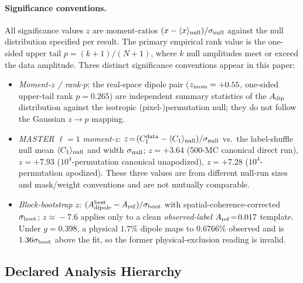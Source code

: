 \documentclass[aps,prd,twocolumn,superscriptaddress,preprintnumbers,nofootinbib,longbibliography,floatfix]{revtex4-2}
\begin{document}
\paragraph{Significance conventions.}
All significance values $z$ are moment-ratios $(x - \langle x\rangle_{\rm null})/\sigma_{\rm null}$ against the null distribution specified per result. The primary empirical rank value is the one-sided upper tail $p=(k+1)/(N+1)$, where $k$ null amplitudes meet or exceed the data amplitude. Three distinct significance conventions appear in this paper:
\begin{itemize}\setlength{\itemsep}{0pt}
\item \emph{Moment-$z$ / rank-$p$}: the real-space dipole pair ($z_{\rm mom}=+0.55$, one-sided upper-tail rank $p=0.265$) are independent summary statistics of the $A_{\rm dip}$ distribution against the isotropic (pixel-)permutation null; they do not follow the Gaussian $z\!\to\!p$ mapping.
\item \emph{MASTER $\ell\!=\!1$ moment-$z$}: $z\!=\!(C_1^{\rm data}-\langle C_1\rangle_{\rm null})/\sigma_{\rm null}$ vs.\ the label-shuffle null mean $\langle C_1\rangle_{\rm null}$ and width $\sigma_{\rm null}$; $z=+3.64$ (500-MC canonical direct run), $z=+7.93$ ($10^4$-permutation canonical unapodized), $z=+7.28$ ($10^4$-permutation apodized). These three values are from different null-run sizes and mask/weight conventions and are not mutually comparable.
\item \emph{Block-bootstrap $z$}: $(A_{\rm dipole}^{\rm best} - A_{\rm ref})/\sigma_{\rm boot}$ with spatial-coherence-corrected $\sigma_{\rm boot}$; $z\!\approx\!-7.6$ applies only to a clean \emph{observed-label} $A_{\rm ref}\!=\!0.017$ template. Under $g=0.398$, a physical $1.7\%$ dipole maps to $0.6766\%$ observed and is $1.36\sigma_{\rm boot}$ above the fit, so the former physical-exclusion reading is invalid.
\end{itemize}

\subsection{Declared Analysis Hierarchy}
\label{sec:prereg}
\end{document}
